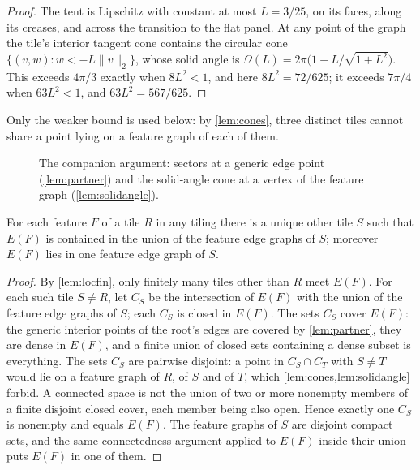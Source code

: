 \begin{proof}
The tent is Lipschitz with constant at most $L=3/25$, on its faces, along its creases, and across
the transition to the flat panel. At any point of the graph the tile's interior tangent cone
contains the circular cone $\{(v,w): w<-L\|v\|_2\}$, whose solid angle is
$\Omega(L)=2\pi\bigl(1-L/\sqrt{1+L^2}\bigr)$. This exceeds $4\pi/3$ exactly when $8L^2<1$, and here
$8L^2=72/625$; it exceeds $7\pi/4$ when $63L^2<1$, and $63L^2=567/625$.
\end{proof}

Only the weaker bound is used below: by \cref{lem:cones}, three distinct tiles cannot share a
point lying on a feature graph of each of them.

\begin{figure}[ht]
  \centering
  \resizebox{\linewidth}{!}{}
  \caption{The companion argument: sectors at a generic edge point (\cref{lem:partner}) and the
  solid-angle cone at a vertex of the feature graph (\cref{lem:solidangle}).}
  \label{fig:companion}
\end{figure}

\begin{theorem}\label{thm:companion}
For each feature $F$ of a tile $R$ in any tiling there is a unique other tile $S$ such that
$E(F)$ is contained in the union of the feature edge graphs of $S$; moreover $E(F)$ lies in one
feature edge graph of $S$.
\end{theorem}

\begin{proof}
By \cref{lem:locfin}, only finitely many tiles other than $R$ meet $E(F)$. For each such tile
$S\ne R$, let $C_S$ be the intersection of $E(F)$ with the union of the feature edge graphs of
$S$; each $C_S$ is closed in $E(F)$. The sets $C_S$ cover $E(F)$: the generic interior points of the root's edges are covered
by \cref{lem:partner}, they are dense in $E(F)$, and a finite union of closed sets containing a
dense subset is everything. The sets $C_S$ are pairwise disjoint: a point in $C_S\cap C_T$ with
$S\ne T$ would lie on a feature graph of $R$, of $S$ and of $T$, which \cref{lem:cones,lem:solidangle}
forbid. A connected space is not the union of two or more nonempty members of a finite disjoint
closed cover, each member being also open. Hence exactly one $C_S$ is nonempty and equals $E(F)$.
The feature graphs of $S$ are disjoint compact sets, and the same connectedness argument applied
to $E(F)$ inside their union puts $E(F)$ in one of them.
\end{proof}

